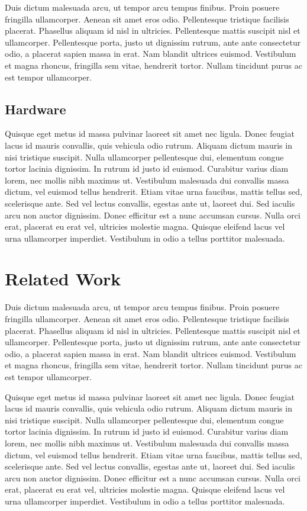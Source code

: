 \documentclass[conference]{IEEEtran}
\begin{document}
Duis dictum malesuada arcu, ut tempor arcu tempus finibus. Proin posuere fringilla ullamcorper. Aenean sit amet eros odio. Pellentesque tristique facilisis placerat. Phasellus aliquam id nisl in ultricies. Pellentesque mattis suscipit nisl et ullamcorper. Pellentesque porta, justo ut dignissim rutrum, ante ante consectetur odio, a placerat sapien massa in erat. Nam blandit ultrices euismod. Vestibulum et magna rhoncus, fringilla sem vitae, hendrerit tortor. Nullam tincidunt purus ac est tempor ullamcorper.

\subsection{Hardware}

Quisque eget metus id massa pulvinar laoreet sit amet nec ligula. Donec feugiat lacus id mauris convallis, quis vehicula odio rutrum. Aliquam dictum mauris in nisi tristique suscipit. Nulla ullamcorper pellentesque dui, elementum congue tortor lacinia dignissim. In rutrum id justo id euismod. Curabitur varius diam lorem, nec mollis nibh maximus ut. Vestibulum malesuada dui convallis massa dictum, vel euismod tellus hendrerit. Etiam vitae urna faucibus, mattis tellus sed, scelerisque ante. Sed vel lectus convallis, egestas ante ut, laoreet dui. Sed iaculis arcu non auctor dignissim. Donec efficitur est a nunc accumsan cursus. Nulla orci erat, placerat eu erat vel, ultricies molestie magna. Quisque eleifend lacus vel urna ullamcorper imperdiet. Vestibulum in odio a tellus porttitor malesuada.

\section{Related Work}

Duis dictum malesuada arcu, ut tempor arcu tempus finibus. Proin posuere fringilla ullamcorper. Aenean sit amet eros odio. Pellentesque tristique facilisis placerat. Phasellus aliquam id nisl in ultricies. Pellentesque mattis suscipit nisl et ullamcorper. Pellentesque porta, justo ut dignissim rutrum, ante ante consectetur odio, a placerat sapien massa in erat. Nam blandit ultrices euismod. Vestibulum et magna rhoncus, fringilla sem vitae, hendrerit tortor. Nullam tincidunt purus ac est tempor ullamcorper.

Quisque eget metus id massa pulvinar laoreet sit amet nec ligula. Donec feugiat lacus id mauris convallis, quis vehicula odio rutrum. Aliquam dictum mauris in nisi tristique suscipit. Nulla ullamcorper pellentesque dui, elementum congue tortor lacinia dignissim. In rutrum id justo id euismod. Curabitur varius diam lorem, nec mollis nibh maximus ut. Vestibulum malesuada dui convallis massa dictum, vel euismod tellus hendrerit. Etiam vitae urna faucibus, mattis tellus sed, scelerisque ante. Sed vel lectus convallis, egestas ante ut, laoreet dui. Sed iaculis arcu non auctor dignissim. Donec efficitur est a nunc accumsan cursus. Nulla orci erat, placerat eu erat vel, ultricies molestie magna. Quisque eleifend lacus vel urna ullamcorper imperdiet. Vestibulum in odio a tellus porttitor malesuada.
\end{document}
